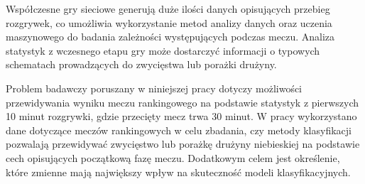\documentclass[twoside]{customStyle}
\begin{document}
Współczesne gry sieciowe generują duże ilości danych opisujących przebieg rozgrywek, co umożliwia wykorzystanie metod analizy danych oraz uczenia maszynowego do badania zależności występujących podczas meczu. Analiza statystyk z wczesnego etapu gry może dostarczyć informacji o typowych schematach prowadzących do zwycięstwa lub porażki drużyny.

Problem badawczy poruszany w niniejszej pracy dotyczy możliwości przewidywania wyniku meczu rankingowego na podstawie statystyk z pierwszych 10 minut rozgrywki, gdzie przecięty mecz trwa 30 minut. W pracy wykorzystano dane dotyczące meczów rankingowych w celu zbadania, czy metody klasyfikacji pozwalają przewidywać zwycięstwo lub porażkę drużyny niebieskiej na podstawie cech opisujących początkową fazę meczu. Dodatkowym celem jest określenie, które zmienne mają największy wpływ na skuteczność modeli klasyfikacyjnych.
\end{document}
